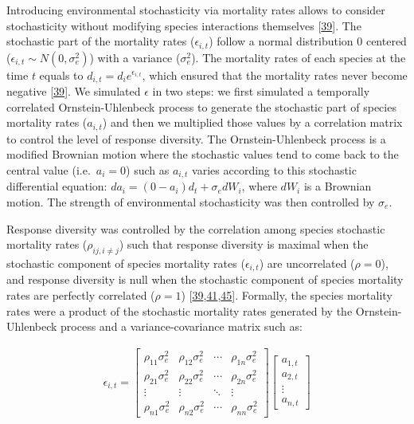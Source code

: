 \documentclass[
]{article}
\begin{document}
Introducing environmental stochasticity via mortality rates allows to consider
stochasticity without modifying species interactions themselves
{[}\protect\hyperlink{ref-vasseur_environmental_2007}{39}{]}. The stochastic part of the mortality rates
(\(\epsilon_{i, t}\)) follow a normal distribution 0 centered (\(\epsilon_{i, t} \sim N(0,\sigma^2_e)\)) with a variance (\(\sigma^2_e\)). The mortality rates of
each species at the time \(t\) equals to \(d_{i,t} = d_i e^{\epsilon_{i, t}}\),
which ensured that the mortality rates never become negative
{[}\protect\hyperlink{ref-vasseur_environmental_2007}{39}{]}. We simulated \(\epsilon\) in two steps: we first
simulated a temporally correlated Ornstein-Uhlenbeck process to generate the
stochastic part of species mortality rates (\(a_{i, t}\)) and then we multiplied
those values by a correlation matrix to control the level of response
diversity. The Ornstein-Uhlenbeck process is a modified Brownian motion where
the stochastic values tend to come back to the central value (i.e.~\(a_i = 0\))
such as \(a_{i, t}\) varies according to this stochastic differential equation:
\(da_{i} = (0 - a_i)d_t + \sigma_e dW_i\), where \(dW_i\) is a Brownian motion. The
strength of environmental stochasticity was then controlled by \(\sigma_e\).

Response diversity was controlled by the correlation among species
stochastic mortality rates (\(\rho_{ij, i \neq j}\)) such that response diversity is
maximal when the stochastic component of species mortality rates (\(\epsilon_{i, t}\)) are uncorrelated (\(\rho = 0\)), and response diversity is null when the
stochastic component of species mortality rates are perfectly correlated (\(\rho = 1\)) {[}\protect\hyperlink{ref-vasseur_environmental_2007}{39},\protect\hyperlink{ref-ripa_food_2003}{41},\protect\hyperlink{ref-gouhier_synchrony_2010}{45}{]}.
Formally, the species mortality rates were a product of the stochastic mortality rates
generated by the Ornstein-Uhlenbeck process and a variance-covariance matrix
such as:

\begin{equation}
\begin{aligned}
\epsilon_{i, t} =
  \begin{bmatrix}
     \rho_{11}\sigma^2_e & \rho_{12}\sigma^2_e & \cdots & \rho_{1n}\sigma^2_e \\
     \rho_{21}\sigma^2_e & \rho_{22}\sigma^2_e & \cdots & \rho_{2n}\sigma^2_e \\
     \vdots  & \vdots  & \ddots & \vdots  \\
     \rho_{n1}\sigma^2_e & \rho_{n2}\sigma^2_e & \cdots & \rho_{nn}\sigma^2_e
  \end{bmatrix}
  \begin{bmatrix}
     a_{1,t} \\
     a_{2,t} \\
     \vdots  \\
     a_{n,t}
  \end{bmatrix}
\label{eq:rho}
\end{aligned}
\end{equation}
\end{document}

